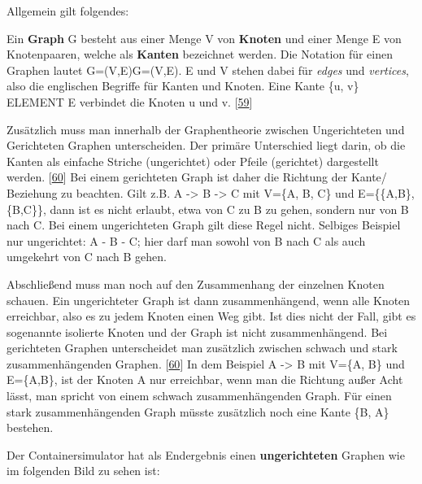 \documentclass[
    headings=optiontotocandhead,%
    twoside,
    numbers=noenddot,%
    12pt, %
    titlepage, %
    parskip=full, %
    listof=leveldown, 
    numbers=noenddot, %
    a4paper,DIV=14,
    BCOR=15mm,
]{scrbook}
\renewenvironment{quote}{\begin{customblockquote}\list{}{\rightmargin=0em\leftmargin=0em}%
\item\relax\color{blockquote-text}\ignorespaces}{\unskip\unskip\endlist\end{customblockquote}}
\begin{document}
Allgemein gilt folgendes:

\begin{quote}
Ein \textbf{Graph} G besteht aus einer Menge V von \textbf{Knoten} und
einer Menge E von Knotenpaaren, welche als \textbf{Kanten} bezeichnet
werden. Die Notation für einen Graphen lautet G=(V,E)G=(V,E). E und V
stehen dabei für \emph{edges} und \emph{vertices}, also die englischen
Begriffe für Kanten und Knoten. Eine Kante \{u, v\} ELEMENT E verbindet
die Knoten u und v.
{[}\protect\hyperlink{ref-Uni-Bremen-Graphentheorie}{59}{]}
\end{quote}

Zusätzlich muss man innerhalb der Graphentheorie zwischen Ungerichteten
und Gerichteten Graphen unterscheiden. Der primäre Unterschied liegt
darin, ob die Kanten als einfache Striche (ungerichtet) oder Pfeile
(gerichtet) dargestellt werden.
{[}\protect\hyperlink{ref-Studyflix-Graphentheorie}{60}{]} Bei einem
gerichteten Graph ist daher die Richtung der Kante/ Beziehung zu
beachten. Gilt z.B. A -\textgreater{} B -\textgreater{} C mit V=\{A, B,
C\} und E=\{\{A,B\}, \{B,C\}\}, dann ist es nicht erlaubt, etwa von C zu
B zu gehen, sondern nur von B nach C. Bei einem ungerichteten Graph gilt
diese Regel nicht. Selbiges Beispiel nur ungerichtet: A - B - C; hier
darf man sowohl von B nach C als auch umgekehrt von C nach B gehen.

Abschließend muss man noch auf den Zusammenhang der einzelnen Knoten
schauen. Ein ungerichteter Graph ist dann zusammenhängend, wenn alle
Knoten erreichbar, also es zu jedem Knoten einen Weg gibt. Ist dies
nicht der Fall, gibt es sogenannte isolierte Knoten und der Graph ist
nicht zusammenhängend. Bei gerichteten Graphen unterscheidet man
zusätzlich zwischen schwach und stark zusammenhängenden Graphen.
{[}\protect\hyperlink{ref-Studyflix-Graphentheorie}{60}{]} In dem
Beispiel A -\textgreater{} B mit V=\{A, B\} und E=\{A,B\}, ist der
Knoten A nur erreichbar, wenn man die Richtung außer Acht lässt, man
spricht von einem schwach zusammenhängenden Graph. Für einen stark
zusammenhängenden Graph müsste zusätzlich noch eine Kante \{B, A\}
bestehen.

Der Containersimulator hat als Endergebnis einen \textbf{ungerichteten}
Graphen wie im folgenden Bild zu sehen ist:
\end{document}
